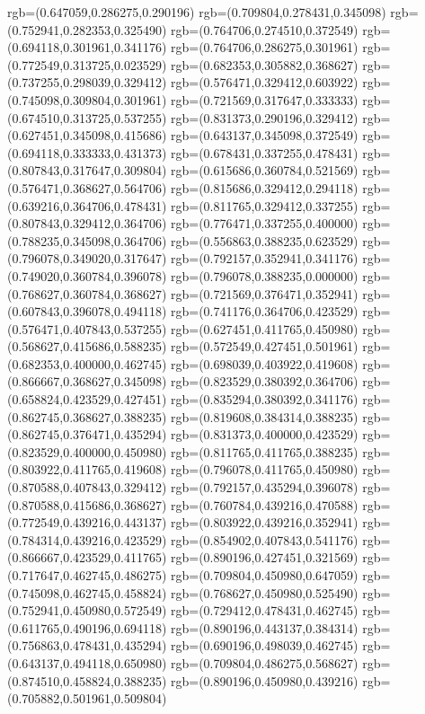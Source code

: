 {{rgb=(0.647059,0.286275,0.290196)
rgb=(0.709804,0.278431,0.345098)
rgb=(0.752941,0.282353,0.325490)
rgb=(0.764706,0.274510,0.372549)
rgb=(0.694118,0.301961,0.341176)
rgb=(0.764706,0.286275,0.301961)
rgb=(0.772549,0.313725,0.023529)
rgb=(0.682353,0.305882,0.368627)
rgb=(0.737255,0.298039,0.329412)
rgb=(0.576471,0.329412,0.603922)
rgb=(0.745098,0.309804,0.301961)
rgb=(0.721569,0.317647,0.333333)
rgb=(0.674510,0.313725,0.537255)
rgb=(0.831373,0.290196,0.329412)
rgb=(0.627451,0.345098,0.415686)
rgb=(0.643137,0.345098,0.372549)
rgb=(0.694118,0.333333,0.431373)
rgb=(0.678431,0.337255,0.478431)
rgb=(0.807843,0.317647,0.309804)
rgb=(0.615686,0.360784,0.521569)
rgb=(0.576471,0.368627,0.564706)
rgb=(0.815686,0.329412,0.294118)
rgb=(0.639216,0.364706,0.478431)
rgb=(0.811765,0.329412,0.337255)
rgb=(0.807843,0.329412,0.364706)
rgb=(0.776471,0.337255,0.400000)
rgb=(0.788235,0.345098,0.364706)
rgb=(0.556863,0.388235,0.623529)
rgb=(0.796078,0.349020,0.317647)
rgb=(0.792157,0.352941,0.341176)
rgb=(0.749020,0.360784,0.396078)
rgb=(0.796078,0.388235,0.000000)
rgb=(0.768627,0.360784,0.368627)
rgb=(0.721569,0.376471,0.352941)
rgb=(0.607843,0.396078,0.494118)
rgb=(0.741176,0.364706,0.423529)
rgb=(0.576471,0.407843,0.537255)
rgb=(0.627451,0.411765,0.450980)
rgb=(0.568627,0.415686,0.588235)
rgb=(0.572549,0.427451,0.501961)
rgb=(0.682353,0.400000,0.462745)
rgb=(0.698039,0.403922,0.419608)
rgb=(0.866667,0.368627,0.345098)
rgb=(0.823529,0.380392,0.364706)
rgb=(0.658824,0.423529,0.427451)
rgb=(0.835294,0.380392,0.341176)
rgb=(0.862745,0.368627,0.388235)
rgb=(0.819608,0.384314,0.388235)
rgb=(0.862745,0.376471,0.435294)
rgb=(0.831373,0.400000,0.423529)
rgb=(0.823529,0.400000,0.450980)
rgb=(0.811765,0.411765,0.388235)
rgb=(0.803922,0.411765,0.419608)
rgb=(0.796078,0.411765,0.450980)
rgb=(0.870588,0.407843,0.329412)
rgb=(0.792157,0.435294,0.396078)
rgb=(0.870588,0.415686,0.368627)
rgb=(0.760784,0.439216,0.470588)
rgb=(0.772549,0.439216,0.443137)
rgb=(0.803922,0.439216,0.352941)
rgb=(0.784314,0.439216,0.423529)
rgb=(0.854902,0.407843,0.541176)
rgb=(0.866667,0.423529,0.411765)
rgb=(0.890196,0.427451,0.321569)
rgb=(0.717647,0.462745,0.486275)
rgb=(0.709804,0.450980,0.647059)
rgb=(0.745098,0.462745,0.458824)
rgb=(0.768627,0.450980,0.525490)
rgb=(0.752941,0.450980,0.572549)
rgb=(0.729412,0.478431,0.462745)
rgb=(0.611765,0.490196,0.694118)
rgb=(0.890196,0.443137,0.384314)
rgb=(0.756863,0.478431,0.435294)
rgb=(0.690196,0.498039,0.462745)
rgb=(0.643137,0.494118,0.650980)
rgb=(0.709804,0.486275,0.568627)
rgb=(0.874510,0.458824,0.388235)
rgb=(0.890196,0.450980,0.439216)
rgb=(0.705882,0.501961,0.509804)
}}
